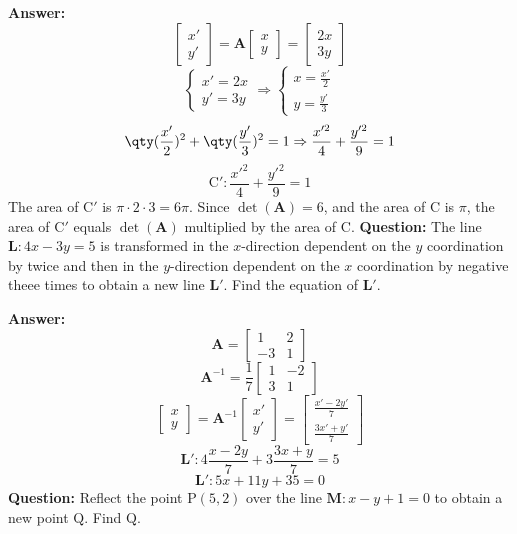 \documentclass[a4paper,12pt]{report}
\begin{document}
\textbf{Answer:} 
\[\begin{bmatrix}x'\\y'\end{bmatrix}=\mathbf{A}\begin{bmatrix}x\\y\end{bmatrix}=\begin{bmatrix}2x\\3y\end{bmatrix}\]
\[\begin{cases}x'=2x\\y'=3y\end{cases}\Rightarrow \begin{cases}x=\frac{x'}{2}\\y=\frac{y'}{3}\end{cases}\]
\[\qty(\frac{x'}{2})^2+\qty(\frac{y'}{3})^2=1\Rightarrow \frac{x'^2}{4}+\frac{y'^2}{9}=1\]
\[\mathrm{C}'\colon\frac{x'^2}{4}+\frac{y'^2}{9}=1\]
The area of $\mathrm{C}'$ is $\pi \cdot 2 \cdot 3 = 6\pi$. Since $\det(\mathbf{A}) = 6$, and the area of $\mathrm{C}$ is $\pi$, the area of $\mathrm{C}'$ equals $\det(\mathbf{A})$ multiplied by the area of $\mathrm{C}$.
\textbf{Question:} The line $\mathbf{L}: 4x - 3y = 5$ is transformed in the $x$-direction dependent on the $y$ coordination by twice and then in the $y$-direction dependent on the $x$ coordination by negative theee times to obtain a new line $\mathbf{L}'$. Find the equation of $\mathbf{L}'$.

\textbf{Answer:} 
\[\mathbf{A}=\begin{bmatrix}1&2\\-3&1\end{bmatrix}\]
\[\mathbf{A}^{-1}=\frac{1}{7}\begin{bmatrix}1&-2\\3&1\end{bmatrix}\]
\[\begin{bmatrix}x\\y\end{bmatrix}=\mathbf{A}^{-1}\begin{bmatrix}x'\\y'\end{bmatrix}=\begin{bmatrix}\frac{x'-2y'}{7}\\ \frac{3x'+y'}{7}\end{bmatrix}\]
\[\mathbf{L}': 4\frac{x-2y}{7}+3\frac{3x+y}{7}=5\]
\[\mathbf{L}': 5x+11y+35=0\]
\textbf{Question:} Reflect the point $\mathrm{P}(5, 2)$ over the line $\mathbf{M}: x - y + 1 = 0$ to obtain a new point $\mathrm{Q}$. Find $\mathrm{Q}$.
\end{document}
